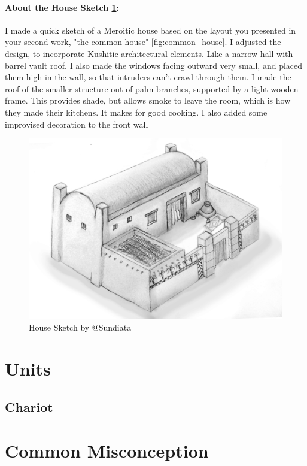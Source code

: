 \documentclass[a4paper,12pt]{scrreprt}
\begin{document}
\paragraph{About the House Sketch \ref{fig:house_sketch}:} I made a quick sketch of a Meroitic house based on the layout you presented in your second work, "the common house" \ref{fig:common_house}. I adjusted the design, to incorporate Kushitic architectural elements. Like a narrow hall with barrel vault roof. I also made the windows facing outward very small, and placed them high in the wall, so that intruders can't crawl through them. I made the roof of the smaller structure out of palm branches, supported by a light wooden frame. This provides shade, but allows smoke to leave the room, which is how they made their kitchens. It makes for good cooking. I also added some improvised decoration to the front wall 

\begin{figure}[H]
	\centering
	\includegraphics[width=\textwidth]{img/house/sundiata_house_sketch}
	\caption{House Sketch by @Sundiata}\label{fig:house_sketch}
\end{figure}

\section{Units}

\subsection{Chariot}

\section{Common Misconception}
\end{document}

